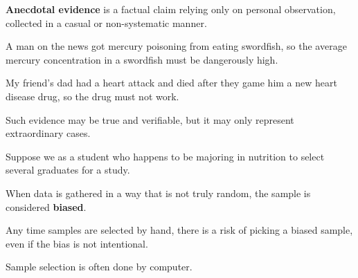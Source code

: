 \documentclass{beamer}
\begin{document}
\begin{frame}
\begin{definition}
\textbf{Anecdotal evidence} is a factual claim relying only on personal observation, collected in a casual or non-systematic manner.
\end{definition}\pause

\begin{example}
A man on the news got mercury poisoning from eating swordfish, so the average mercury concentration in a swordfish must be dangerously high.
\end{example}\pause

\begin{example}
My friend's dad had a heart attack and died after they game him a new heart disease drug, so the drug must not work.
\end{example}\pause

\begin{note}
Such evidence may be true and verifiable, but it may only represent extraordinary cases. 
\end{note}
\end{frame}

\begin{frame}
\begin{example}
Suppose we as a student who happens to be majoring in nutrition to select several graduates for a study.

\vspace{3mm}
\pause

\vspace{3mm}
\end{example}\pause

\begin{definition}
When data is gathered in a way that is not truly random, the sample is considered \textbf{biased}.
\end{definition}\pause

\begin{note}
Any time samples are selected by hand, there is a risk of picking a biased sample, even if the bias is not intentional.
\end{note}\pause

\begin{note}
Sample selection is often done by computer.
\end{note}
\end{frame}
\end{document}
